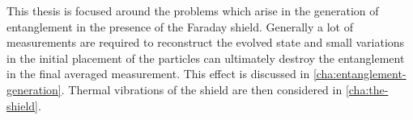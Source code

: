 This thesis is focused around the problems which arise in the generation of entanglement in the presence of the Faraday shield.
Generally a lot of measurements are required to reconstruct the evolved state and small variations in the initial placement of the particles can ultimately destroy the entanglement in the final averaged measurement.
This effect is discussed in \cref{cha:entanglement-generation}. Thermal vibrations of the shield are then considered in \cref{cha:the-shield}.
